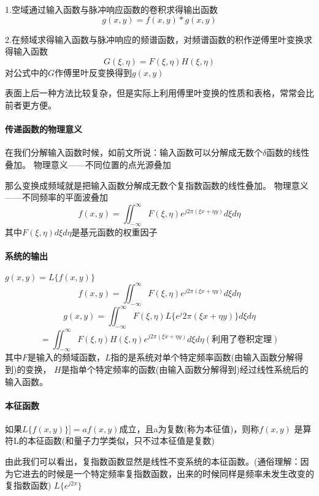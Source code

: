 \documentclass[UTF8]{ctexart}
\newcommand{\dbinf}{\iint_{-\infty}^{\infty}}
\begin{document}
1.空域通过输入函数与脉冲响应函数的卷积求得输出函数
\[
g(x,y)=f(x,y)*g(x,y)    
    \]
        
2.在频域求得输入函数与脉冲响应的频谱函数，对频谱函数的积作逆傅里叶变换求得输入函数
\[
G(\xi,\eta)=F(\xi,\eta)H(\xi,\eta)    
\]    
对公式中的$G$作傅里叶反变换得到$g(x,y)$

表面上后一种方法比较复杂，但是实际上利用傅里叶变换的性质和表格，常常会比前者更方便。

\paragraph{传递函数的物理意义}
在我们分解输入函数时候，如前文所说：输入函数可以分解成无数个$\delta$函数的线性叠加。
物理意义——不同位置的点光源叠加

那么变换成频域就是把输入函数分解成无数个复指数函数的线性叠加。
物理意义——不同频率的平面波叠加
\[
    f(x,y)=\dbinf F(\xi,\eta)e^{j2\pi(\xi x+\eta y)}d\xi d\eta
    \]
其中$F(\xi,\eta)d\xi d\eta$是基元函数的权重因子
\paragraph{系统的输出}
$g(x,y)=L\{f(x,y)\}$
\[f(x,y)=\dbinf F(\xi,\eta)e^{j2\pi(\xi x+\eta y)}d\xi d\eta
    \]
\[g(x,y)=\dbinf F(\xi,\eta) L\{e^j2\pi(\xi x+\eta y)\}d\xi d\eta    
\]\[=\dbinf F(\xi,\eta)H(\xi,\eta)e^{j2\pi(\xi x+\eta y)}d\xi d\eta
(利用了卷积定理)
\]
其中$F$是输入的频域函数，$L$指的是系统对单个特定频率函数(由输入函数分解得到)的变换，
$H$是指单个特定频率的函数(由输入函数分解得到)经过线性系统后的输入函数。


\paragraph{本征函数}如果$L\{f(x,y)\}]=af(x,y)$成立，且a为复数(称为本征值)，则称$f(x,y)$
是算符L的本征函数(和量子力学类似，只不过本征值是复数)

由此我们可以看出，复指数函数显然是线性不变系统的本征函数。(通俗理解：因为它进去的时候是一个特定频率复指数函数，出来的时候同样是频率未发生改变的复指数函数)
$L\{e^{j2\pi}\}$
\end{document}
